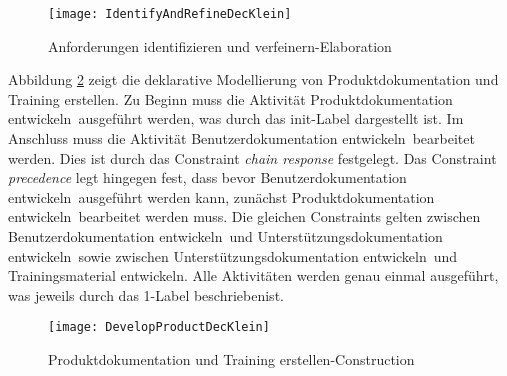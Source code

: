 \begin{figure}[h]
\begin{center}
  \texttt{[image: IdentifyAndRefineDecKlein]} %
  \caption{Anforderungen identifizieren und verfeinern-Elaboration}
  \label{fig:IdentifyAndRefineDecKlein}
\end{center}
\end{figure}



Abbildung \ref{fig:DevelopProductDecKlein} zeigt die deklarative Modellierung von Produktdokumentation und Training erstellen.
Zu Beginn muss die Aktivität \grqq Produktdokumentation entwickeln\grqq \ ausgeführt werden, was durch das init-Label dargestellt ist. Im Anschluss muss die Aktivität \grqq Benutzerdokumentation entwickeln\grqq \ bearbeitet werden. Dies ist durch das Constraint \textit{chain response} festgelegt. Das Constraint \textit{precedence} legt hingegen fest, dass bevor \grqq Benutzerdokumentation entwickeln\grqq \ ausgeführt werden kann, zunächst \grqq Produktdokumentation entwickeln\grqq \ bearbeitet werden muss. Die gleichen Constraints gelten zwischen \grqq Benutzerdokumentation entwickeln\grqq \ und \grqq Unterstützungsdokumentation entwickeln\grqq \ sowie zwischen \grqq Unterstützungsdokumentation entwickeln\grqq \ und \grqq Trainingsmaterial entwickeln\grqq. Alle Aktivitäten werden genau einmal ausgeführt, was jeweils durch das 1-Label beschriebenist. 

\begin{figure}[htp]
\begin{center}
  \texttt{[image: DevelopProductDecKlein]} %
  \caption{Produktdokumentation und Training erstellen-Construction}
  \label{fig:DevelopProductDecKlein}
\end{center}
\end{figure}

